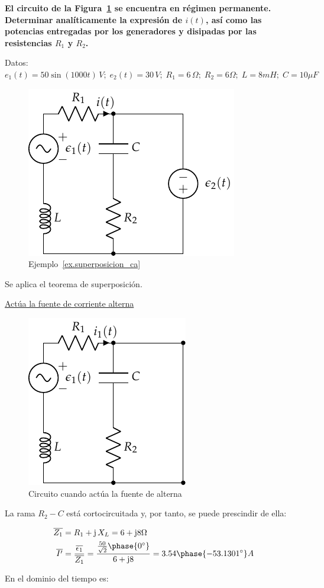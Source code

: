 	
	\begin{example}\label{ex.superposicion_ca}
\textbf{El circuito de la Figura~\ref{fig.superposicion1} se encuentra en régimen permanente. Determinar
analíticamente la expresión de $i(t)$, así como las potencias entregadas por los
generadores y disipadas por las resistencias $R_1$ y $R_2$.}

Datos: $e_1(t) = {50 \sin(1000 t)}\,V;\; e_2(t) = {30}\,V;\; R_1 = 6\,\Omega;\; R_2 = {6}{\Omega};\; L = {8}{mH};\; C = {10}{\mu F}$

\begin{figure}[H]
    \centering
    \includegraphics[width=0.25\linewidth]{../figs/superposicion1.pdf}
    \caption{Ejemplo~\ref{ex.superposicion_ca}}
    \label{fig.superposicion1}
\end{figure}

Se aplica el teorema de superposición. 

\underline{Actúa la fuente de corriente alterna}

\begin{figure}[H]
    \centering
    \includegraphics[width=0.25\linewidth]{../figs/superposicion1_AC.pdf}
    \caption{Circuito cuando actúa la fuente de alterna}
    \label{fig.superposicion1_AC}
\end{figure}

La rama $R_2 - C$ está cortocircuitada y, por tanto, se puede prescindir de ella:

\begin{align*}
  \overline{Z_1} &= R_1 + \mathrm{j}\,X_L = 6 + \mathrm{j}8\Omega\\
  \overline{I'} &= \dfrac{\overline{\epsilon_1}}{\overline{Z_1}} = \dfrac{\frac{50}{\sqrt{2}}\phase{0^\circ}}{6+\mathrm{j}8}=3.54\phase{-53.1301^\circ} A
\end{align*}

En el dominio del tiempo es:


\end{example}
